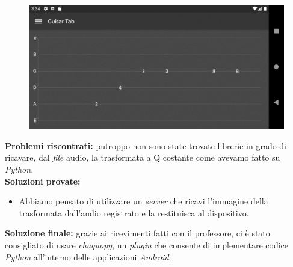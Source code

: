 \begin{figure}[H]
	\centering
	\includegraphics[scale=0.15]{./images/img19.png}
\end{figure}
\noindent \textbf{Problemi riscontrati:} putroppo non sono state trovate librerie in grado di ricavare, dal \textit{file} audio, la trasformata a Q costante come avevamo fatto su \textit{Python}.\\
\newline
%
\textbf{Soluzioni provate:}
\begin{itemize}
	\item Abbiamo pensato di utilizzare un \textit{server} che ricavi l'immagine della trasformata dall'audio registrato e la restituisca al dispositivo.\\
\end{itemize}
%
\textbf{Soluzione finale:} grazie ai ricevimenti fatti con il professore, ci è stato consigliato di usare \textit{chaquopy}, un \textit{plugin} che consente di implementare codice \textit{Python} all'interno delle applicazioni \textit{Android}.
